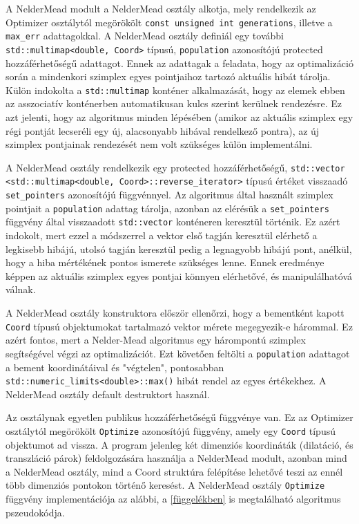 \documentclass[oneside,titlepage,12pt,a4paper]{report}
\begin{document}
\par A NelderMead modult a NelderMead osztály alkotja, mely rendelkezik az Optimizer osztálytól megörökölt \texttt{const unsigned int generations}, illetve a \texttt{max\_err} adattagokkal. A NelderMead osztály definiál egy további \texttt{std::multimap<double, Coord>} típusú, \texttt{population} azonosítójú protected hozzáférhetőségű adattagot. Ennek az adattagak a feladata, hogy az optimalizáció során a mindenkori szimplex egyes pointjaihoz tartozó aktuális hibát tárolja. Külön indokolta a \texttt{std::multimap} konténer alkalmazását, hogy az elemek ebben az asszociatív konténerben automatikusan kulcs szerint kerülnek rendezésre. Ez azt jelenti, hogy az algoritmus minden lépésében (amikor az aktuális szimplex egy régi pontját lecseréli egy új, alacsonyabb hibával rendelkező pontra), az új szimplex pontjainak rendezését nem volt szükséges külön implementálni. 
\par A NelderMead osztály rendelkezik egy protected hozzáférhetőségű, \texttt{std::vector} \texttt{<std::multimap<double, Coord>::reverse\_iterator>} típusú értéket visszaadó \linebreak \texttt{set\_pointers} azonosítójú függvénnyel. Az algoritmus által használt szimplex pointjait a \texttt{population} adattag tárolja, azonban az elérésük a \texttt{set\_pointers} függvény által visszaadott \texttt{std::vector} konténeren keresztül történik. Ez azért indokolt, mert ezzel a módszerrel a vektor első tagján keresztül elérhető a legkisebb hibájú, utolsó tagján keresztül pedig a legnagyobb hibájú pont, anélkül, hogy a hiba mértékének pontos ismerete szükséges lenne. Ennek eredménye képpen az aktuális szimplex egyes pontjai könnyen elérhetővé, és manipulálhatóvá válnak. 

\par A NelderMead osztály konstruktora először ellenőrzi, hogy a bementként kapott \texttt{Coord} típusú objektumokat tartalmazó vektor mérete megegyezik-e hárommal. Ez azért fontos, mert a Nelder-Mead algoritmus egy hárompontú szimplex segítségével végzi az optimalizációt. Ezt követően feltölti a \texttt{population} adattagot a bement koordinátáival és "végtelen", pontosabban \texttt{std::numeric\_limits<double>::max()} hibát rendel az egyes értékekhez. A NelderMead osztály default destruktort használ. 
\par Az osztálynak egyetlen publikus hozzáférhetőségű függvénye van. Ez az Optimizer osztálytól megörökölt \texttt{Optimize} azonosítójú függvény, amely egy \texttt{Coord} típusú objektumot ad vissza. A program jelenleg két dimenziós koordináták (dilatáció, és transzláció párok) feldolgozására használja a NelderMead modult, azonban mind a NelderMead osztály, mind a Coord struktúra felépítése lehetővé teszi az ennél több dimenziós pontokon történő keresést. A NelderMead osztály \texttt{Optimize} függvény implementációja az alábbi, a \ref{függelékben} is megtalálható algoritmus pszeudokódja. 
\end{document}

